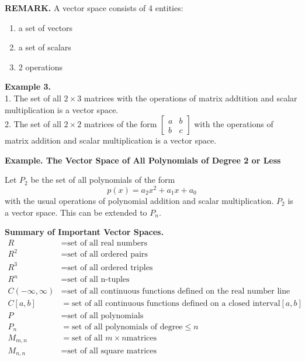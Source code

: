 \documentclass{article}
\newcommand\B{\textbf}
\newcommand\tcl{\begin{tcolorbox}[colback = {blue9}]}
\newcommand\etcl{\end{tcolorbox}}
\newcommand\x{\times}
\begin{document}
    \B{REMARK.} A vector space consists of 4 entities:
    \begin{enumerate}
        \item a set of vectors
        \item a set of scalars
        \item 2 operations
    \end{enumerate}
    
    \B{Example 3.} \\
    1. The set of all $2 \x 3$ matrices with the operations of matrix addtition and
    scalar multiplication is a vector space.\\
    2. The set of all $2 \x 2$ matrices of the form $ \begin{bmatrix}
        a & b\\
        b & c
    \end{bmatrix}$ with the operations of matrix addition and scalar multiplication
    is a vector space.
    
    \B{Example. The Vector Space of All Polynomials of Degree 2 or Less} 

    Let $P_2$ be the set of all polynomials of the form 
    \[ p(x) = a_2x^2 + a_1x + a_0 \]
    with the usual operations of polynomial addition and scalar multiplication. $P_2$ is a 
    vector space. This can be extended to $P_n$.

    \tcl
        \B{Summary of Important Vector Spaces.}
        \begin{equation*}
            \begin{split}
                R & = \text{set of all real numbers} \\
                R^2 & = \text{set of all ordered pairs} \\
                R^3 & = \text{set of all ordered triples} \\
                R^n & = \text{set of all n-tuples} \\
                C(-\infty, \infty) & = \text{set of all continuous functions defined on the real number line} \\
                C[a, b] & = \text{set of all continuous functions defined on a closed interval} [a,b] \\
                P & = \text{set of all polynomials}\\
                P_n & = \text{set of all polynomials of degree} \le n \\
                M_{m,n} & = \text{set of all } m \x n \text{matrices} \\
                M_{n,n} & = \text{set of all square matrices}
            \end{split}
        \end{equation*}
    \etcl 
\end{document}
